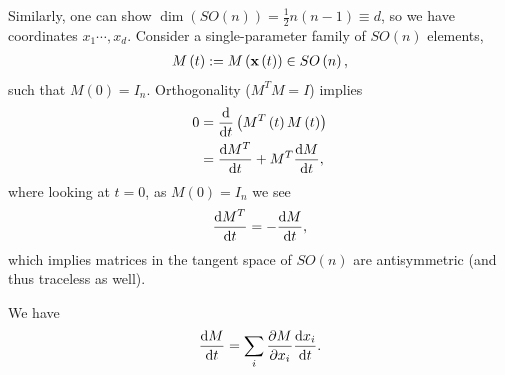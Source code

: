 Similarly, one can show $\dim \left( SO \left( n \right)  \right) = \frac{1}{2} n \left( n - 1 \right) \equiv d $, so we have coordinates $x_1 \cdots, x_d$. Consider a single-parameter family of $SO\left( n \right) $ elements,
\begin{align}
    M\left( t \right) := M\left( \vb{x}\left( t \right)  \right) \in SO \left( n \right) 
,\end{align}
such that $M\left( 0 \right) = I_n$. Orthogonality ($M^{T} M = I$) implies
\begin{align}
    0 &= \dv{t} \left( M^{T}\left( t \right) M\left( t \right)  \right) \\
    &= \dv{M^{T}}{t} + M^{T} \dv{M}{t}
,\end{align}
where looking at $t = 0$, as $M\left( 0 \right) = I_n $ we see
\begin{align}
    \dv{M^{T}}{t} = -\dv{M}{t}
,\end{align}
which implies matrices in the tangent space of $SO \left( n \right) $ are antisymmetric (and thus traceless as well).

We have
\begin{align}
    \dv{M}{t} = \sum_{i}^{} \pdv{M}{x_{i}} \dv{x_{i}}{t} 
.\end{align}






